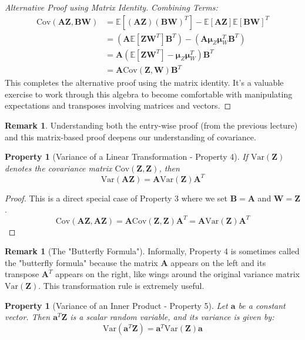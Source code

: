 \documentclass[11pt, letterpaper]{article}
\newtheorem{property}[theorem]{Property}
\theoremstyle{definition}
\newtheorem{remark}[theorem]{Remark}
\newcommand{\E}{\mathbb{E}}
\newcommand{\Var}{\text{Var}}
\newcommand{\Cov}{\text{Cov}}
\newcommand{\mat}[1]{\mathbf{#1}} %
\newcommand{\vect}[1]{\boldsymbol{#1}} %
\newcommand{\T}{^T} %
\begin{document}
\begin{proof}[Alternative Proof using Matrix Identity]
\textit{Combining Terms:}
\begin{align*}
\Cov(\mat{A}\vect{Z}, \mat{B}\vect{W}) &= \E[(\mat{A}\vect{Z})(\mat{B}\vect{W})\T] - \E[\mat{A}\vect{Z}]\E[\mat{B}\vect{W}]\T \\
&= (\mat{A} \E[\vect{Z}\vect{W}\T] \mat{B}\T) - (\mat{A} \vect{\mu}_Z \vect{\mu}_W\T \mat{B}\T) \\
&= \mat{A} (\E[\vect{Z}\vect{W}\T] - \vect{\mu}_Z \vect{\mu}_W\T) \mat{B}\T \\
&= \mat{A} \Cov(\vect{Z}, \vect{W}) \mat{B}\T
\end{align*}
This completes the alternative proof using the matrix identity. It's a valuable exercise to work through this algebra to become comfortable with manipulating expectations and transposes involving matrices and vectors.
\end{proof}

\begin{remark}
Understanding both the entry-wise proof (from the previous lecture) and this matrix-based proof deepens our understanding of covariance.
\end{remark}

\begin{property}[Variance of a Linear Transformation - Property 4]
If $\Var(\vect{Z})$ denotes the covariance matrix $\Cov(\vect{Z}, \vect{Z})$, then
\[
\Var(\mat{A}\vect{Z}) = \mat{A} \Var(\vect{Z}) \mat{A}\T
\]
\end{property}

\begin{proof}
This is a direct special case of Property 3 where we set $\mat{B} = \mat{A}$ and $\vect{W} = \vect{Z}$.
\[
\Cov(\mat{A}\vect{Z}, \mat{A}\vect{Z}) = \mat{A} \Cov(\vect{Z}, \vect{Z}) \mat{A}\T = \mat{A} \Var(\vect{Z}) \mat{A}\T
\]
\end{proof}

\begin{remark}[The "Butterfly Formula"]
Informally, Property 4 is sometimes called the "butterfly formula" because the matrix $\mat{A}$ appears on the left and its transpose $\mat{A}\T$ appears on the right, like wings around the original variance matrix $\Var(\vect{Z})$. This transformation rule is extremely useful.
\end{remark}

\begin{property}[Variance of an Inner Product - Property 5]
Let $\vect{a}$ be a constant vector. Then $\vect{a}\T\vect{Z}$ is a scalar random variable, and its variance is given by:
\[
\Var(\vect{a}\T\vect{Z}) = \vect{a}\T \Var(\vect{Z}) \vect{a}
\]
\end{property}
\end{document}
